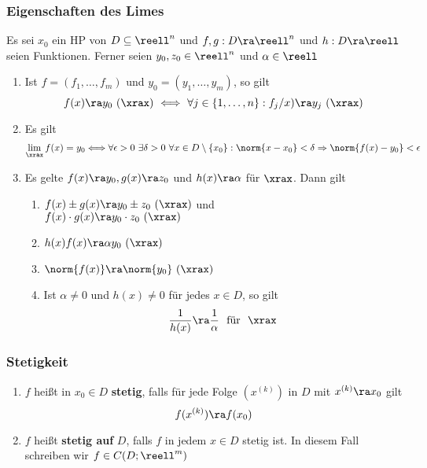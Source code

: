 \documentclass{kit}
\begin{document}
    \subsubsection{Eigenschaften des Limes}
      Es sei $x_0$ ein HP von $D\subseteq\reell^n$ und $f,g:D\ra\reell^n$ und $h:D\ra\reell$ seien Funktionen. Ferner
      seien $y_0,z_0\in\reell^n$ und $\alpha\in\reell$
      \begin{enumerate}
        \item Ist $f=(f_1,\dots,f_m)$ und $y_0=(y_1,\dots,y_m)$, so gilt
          $$f(x)\ra y_0\ (\xrax)\ \Longleftrightarrow\ \forall j\in\{1,\dots,n\}:f_j/x)\ra y_j\ (\xrax)$$
        \item Es gilt
          $$\lim_\xrax f(x)=y_0\Longleftrightarrow\forall\epsilon>0\ \exists\delta>0\ \forall x\in D\setminus\{x_0\}:
          \norm{x-x_0}<\delta\Rightarrow\norm{f(x)-y_0}<\epsilon$$
        \item Es gelte $f(x)\ra y_0,g(x)\ra z_0$ und $h(x)\ra\alpha$ für $\xrax$. Dann gilt
          \begin{enumerate}[label=\roman*)]
            \item $f(x)\pm g(x)\ra y_0\pm z_0\ (\xrax)$ und\\
              $f(x)\cdot g(x)\ra y_0\cdot z_0\ (\xrax)$
            \item $h(x)f(x)\ra\alpha y_0\ (\xrax)$
            \item $\norm{f(x)}\ra\norm{y_0}\ (\xrax)$
            \item Ist $\alpha\neq0$ und $h(x)\neq0$ für jedes $x\in D$, so gilt
              $$\frac{1}{h(x)}\ra\frac{1}{\alpha}\ \text{ für }\ \xrax$$
          \end{enumerate}
      \end{enumerate}
    \subsubsection{Stetigkeit}
      \begin{enumerate}
        \item $f$ heißt in $x_0\in D$ \textbf{stetig}, falls für jede Folge $(x^{(k)})$ in $D$ mit $x^{(k)}\ra x_0$ gilt
          $$f(x^{(k)})\ra f(x_0)$$
        \item $f$ heißt \textbf{stetig auf} $D$, falls $f$ in jedem $x\in D$ stetig ist. In diesem Fall schreiben wir
          $f\in C(D;\reell^m)$
      \end{enumerate}
\end{document}
